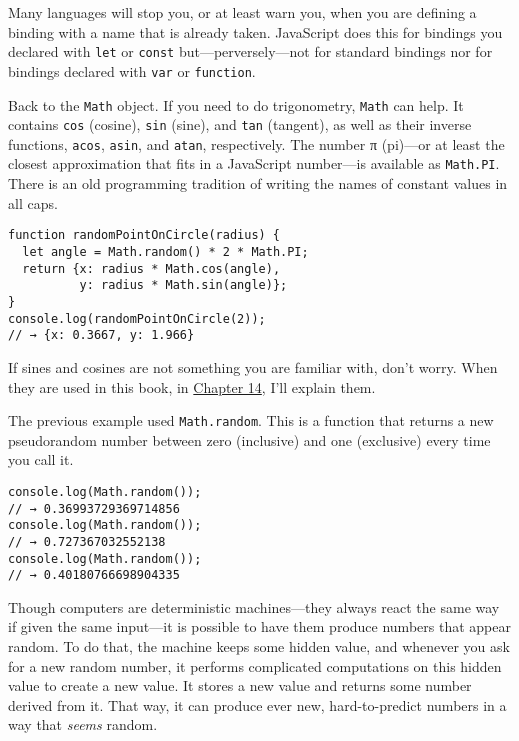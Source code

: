 Many languages will stop you, or at least warn you, when you are defining a binding with a name that is already taken. JavaScript does this for bindings you declared with \lstinline`let` or \lstinline`const` but—perversely—not for standard bindings nor for bindings declared with \lstinline`var` or \lstinline`function`.

Back to the \lstinline`Math` object. If you need to do trigonometry, \lstinline`Math` can help. It contains \lstinline`cos` (cosine), \lstinline`sin` (sine), and \lstinline`tan` (tangent), as well as their inverse functions, \lstinline`acos`, \lstinline`asin`, and \lstinline`atan`, respectively. The number π (pi)—or at least the closest approximation that fits in a JavaScript number—is available as \lstinline`Math.PI`. There is an old programming tradition of writing the names of constant values in all caps.

\begin{lstlisting}
function randomPointOnCircle(radius) {
  let angle = Math.random() * 2 * Math.PI;
  return {x: radius * Math.cos(angle),
          y: radius * Math.sin(angle)};
}
console.log(randomPointOnCircle(2));
// → {x: 0.3667, y: 1.966}
\end{lstlisting}
\noindent

If sines and cosines are not something you are familiar with, don't worry. When they are used in this book, in \hyperref[dom.sin_cos]{Chapter 14}, I'll explain them.

The previous example used \lstinline`Math.random`. This is a function that returns a new pseudorandom number between zero (inclusive) and one (exclusive) every time you call it.

\begin{lstlisting}
console.log(Math.random());
// → 0.36993729369714856
console.log(Math.random());
// → 0.727367032552138
console.log(Math.random());
// → 0.40180766698904335
\end{lstlisting}
\noindent{}

Though computers are deterministic machines—they always react the same way if given the same input—it is possible to have them produce numbers that appear random. To do that, the machine keeps some hidden value, and whenever you ask for a new random number, it performs complicated computations on this hidden value to create a new value. It stores a new value and returns some number derived from it. That way, it can produce ever new, hard-to-predict numbers in a way that \emph{seems} random.

